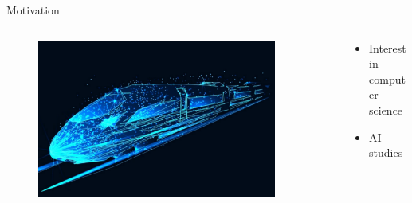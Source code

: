\documentclass[aspectratio=169]{beamer}
\begin{document}
\begin{frame}{Motivation}
    \begin{columns}[T]
        \begin{column}{0.3\textwidth}
            \begin{figure}[H]
                \raggedleft
                \includegraphics[width=0.9\textwidth]{./tex_images/digital_train.png}
            \end{figure}
        \end{column}
        \pause
        \begin{column}{0.65\textwidth}
            \vspace*{0.5cm}
            \begin{itemize}
                \item Interest in computer science
                \item AI studies
            \end{itemize}
        \end{column}
    \end{columns}
\end{frame}
\end{document}
